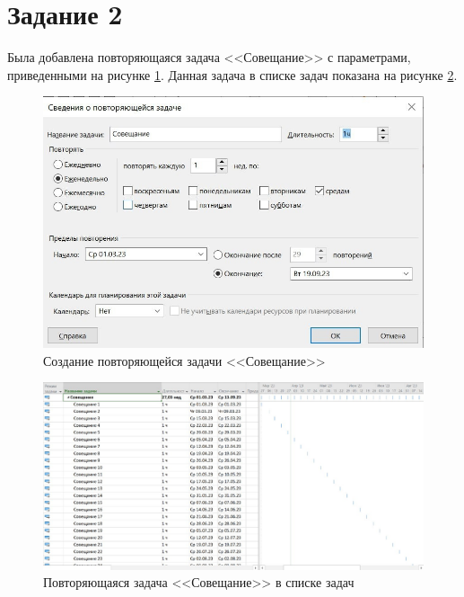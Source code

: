 \section*{Задание 2}

Была добавлена повторяющаяся задача <<Совещание>>  с параметрами, приведенными на рисунке \ref{img:task2-meeting}. Данная задача в списке задач показана на рисунке \ref{img:task2-list-meeting}.

\begin{figure}[H]
	\begin{center}
		\includegraphics[scale=0.3]{inc/img/task2-meeting.jpg}
	\end{center}
	\captionsetup{justification=centering}
	\caption{Создание повторяющейся задачи <<Совещание>>}
	\label{img:task2-meeting}
\end{figure}

\begin{figure}[H]
	\begin{center}
		\includegraphics[scale=0.4]{inc/img/task2-list-meeting.jpg}
	\end{center}
	\captionsetup{justification=centering}
	\caption{Повторяющаяся задача <<Совещание>> в списке задач}
	\label{img:task2-list-meeting}
\end{figure}

